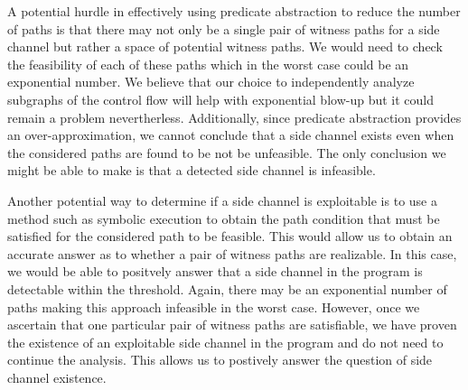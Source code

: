 A potential hurdle in effectively using predicate abstraction to reduce the number of paths is that there may not only be a single pair of witness paths for a side channel but rather a space of potential witness paths. We would need to check the feasibility of each of these paths which in the worst case could be an exponential number. We believe that our choice to independently analyze subgraphs of the control flow will help with exponential blow-up but it could remain a problem nevertherless. Additionally, since predicate abstraction provides an over-approximation, we cannot conclude that a side channel exists even when the considered paths are found to be not be unfeasible. The only conclusion we might be able to make is that a detected side channel is infeasible. 

Another potential way to determine if a side channel is exploitable is to use a method such as symbolic execution \cite{symbolic} to obtain the path condition that must be satisfied for the considered path to be feasible.  This would allow us to obtain an accurate answer as to whether a pair of witness paths are realizable. In this case, we would be able to positvely answer that a side channel in the program is detectable within the threshold. Again, there may be an exponential number of paths making this approach infeasible in the worst case. However, once we ascertain that one particular pair of witness paths are satisfiable, we have proven the existence of an exploitable side channel in the program and do not need to continue the analysis. This allows us to postively answer the question of side channel existence. 